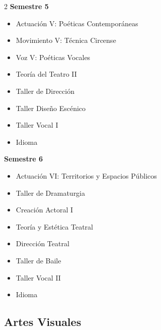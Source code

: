 \documentclass[12pt,a4paper]{article}
\begin{document}
\begin{multicols}{2}
		\textbf{Semestre 5}
		\begin{itemize}
			\item Actuación V: Poéticas Contemporáneas
			\item Movimiento V: Técnica Circense
			\item Voz V: Poéticas Vocales
			\item Teoría del Teatro II
			\item Taller de Dirección
			\item Taller Diseño Escénico
			\item Taller Vocal I
			\item Idioma
		\end{itemize}
		
		\textbf{Semestre 6}
		\begin{itemize}
			\item Actuación VI: Territorios y Espacios Públicos
			\item Taller de Dramaturgia
			\item Creación Actoral I
			\item Teoría y Estética Teatral
			\item Dirección Teatral
			\item Taller de Baile
			\item Taller Vocal II
			\item Idioma
		\end{itemize}
	\end{multicols}
	
	\newpage
	
	\subsection{Artes Visuales}
	
\end{document}
